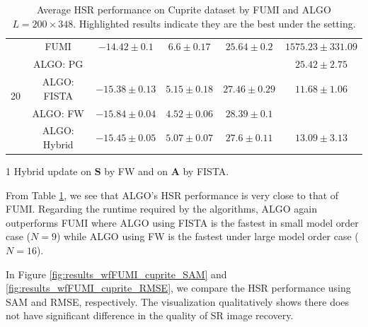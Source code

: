 \begin{table}[h]
{\begin{threeparttable}
\begin{tabular}{|c|c|c|c|c|c|}
\multirow{5}{*}{20} & FUMI                   &                    {$-14.42\pm 0.1$}  &                    {$6.6\pm 0.17$}  &                    {$25.64\pm 0.2$}  &                    {$1575.23\pm 331.09$} \tabularnewline
                    & ALGO: PG               & \cellcolor{red! 10}{$-16.51\pm 0.02$} & \cellcolor{red! 10}{$3.66\pm 0.02$} & \cellcolor{red! 10}{$29.88\pm 0.05$} &                    {$25.42\pm 2.75$}     \tabularnewline
                    & ALGO: FISTA            &                    {$-15.38\pm 0.13$} &                    {$5.15\pm 0.18$} &                    {$27.46\pm 0.29$} &                    {$11.68\pm 1.06$}     \tabularnewline
                    & ALGO: FW               &                    {$-15.84\pm 0.04$} &                    {$4.52\pm 0.06$} &                    {$28.39\pm 0.1$}  & \cellcolor{red! 10}{$8.02\pm 0.71$}      \tabularnewline
                    & ALGO: Hybrid \tnote{1} &                    {$-15.45\pm 0.05$} &                    {$5.07\pm 0.07$} &                    {$27.6\pm 0.11$}  &                    {$13.09\pm 3.13$}     \tabularnewline \hline
\end{tabular}
\begin{tablenotes}
\item[1] Hybrid update on $\bm S$ by FW and on $\bm A$ by FISTA.
\end{tablenotes}
\end{threeparttable}
}
\caption{Average HSR performance on Cuprite dataset by FUMI and ALGO
         $L = 200 \times 348$. Highlighted results indicate they are the best
         under the setting.}
\label{table:ALGO_vs_FUMI_REAL_CUPRITE_MO9_MO16}
\end{table}

From Table \ref{table:ALGO_vs_FUMI_REAL_CUPRITE_MO9_MO16}, we see that ALGO's
HSR performance is very close to that of FUMI.
Regarding the runtime required by the algorithms, ALGO again outperforms FUMI
where ALGO using FISTA is the fastest in small model order case ($N = 9$)
while ALGO using FW is the fastest under large model order case ($N = 16$).

In Figure \ref{fig:results_wfFUMI_cuprite_SAM} and
\ref{fig:results_wfFUMI_cuprite_RMSE}, we compare the HSR performance using
SAM and RMSE, respectively.
The visualization qualitatively shows there does not have significant
difference in the quality of SR image recovery. 


